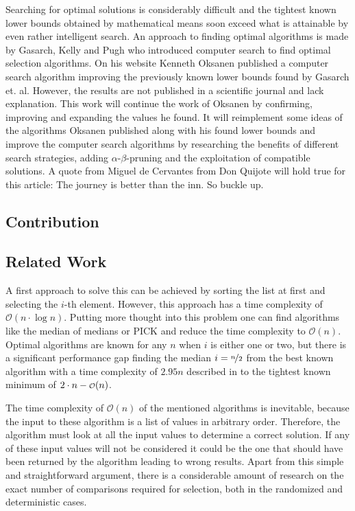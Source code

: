 \documentclass[twoside,leqno,twocolumn]{article}
\newcommand\smallO{
\mathchoice
{{\scriptstyle\mathcal{O}}}%
{{\scriptstyle\mathcal{O}}}%
{{\scriptscriptstyle\mathcal{O}}}%
{\scalebox{.50}{$\scriptscriptstyle\mathcal{O}$}}%
}
\begin{document}
Searching for optimal solutions is considerably difficult and the tightest known
lower bounds obtained by mathematical means soon exceed what is attainable by
even rather intelligent search. An approach to finding optimal algorithms is
made by Gasarch, Kelly and Pugh \cite{Gasarch1996} who introduced computer
search to find optimal selection algorithms. On his website Kenneth Oksanen
\cite{Oksanen} published a computer search algorithm improving the previously
known lower bounds found by Gasarch et. al. However, the results are not
published in a scientific journal and lack explanation. This work will continue
the work of Oksanen \cite{Oksanen} by confirming, improving and expanding the
values he found. It will reimplement some ideas of the algorithms Oksanen
published along with his found lower bounds and improve the computer search
algorithms by researching the benefits of different search strategies, adding
$\alpha$-$\beta$-pruning and the exploitation of compatible solutions. A quote
from Miguel de Cervantes from Don Quijote will hold true for this article: The
journey is better than the inn. \cite{cervantes_don_quijote}
So buckle up.

\subsection{Contribution}

\subsection{Related Work}
A first approach to solve
this can be achieved by sorting the list at first and selecting the $i$-th
element. However, this approach has a time complexity of $\mathcal{O}(n \cdot
  \log n)$. Putting more thought into this problem one can find algorithms like
the median of medians \cite{Schoening1993} or PICK
\cite{Blum1972} and reduce the time complexity to $\mathcal{O}(n)$.
Optimal algorithms are known for any $n$ when $i$ is either one or two, but
there is a significant performance gap finding the median $i = \nicefrac{n}{2}$
from the best known algorithm with a time complexity of $2.95n$ described in
\cite{dor1999selecting} to the tightest known minimum of $2 \cdot n -
  \smallO(n)$.

The time complexity of $\mathcal{O}(n)$ of the mentioned algorithms is
inevitable, because the input to these algorithm is a list of values in
arbitrary order. Therefore, the algorithm must look at all the input values to
determine a correct solution. If any of these input values will not be
considered it could be the one that should have been returned by the algorithm
leading to wrong results. Apart from this simple and straightforward argument,
there is a considerable amount of research on the exact number of comparisons
required for selection, both in the randomized and deterministic cases.
\end{document}
